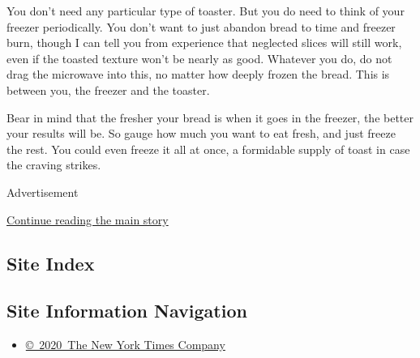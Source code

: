 You don't need any particular type of toaster. But you do need to think
of your freezer periodically. You don't want to just abandon bread to
time and freezer burn, though I can tell you from experience that
neglected slices will still work, even if the toasted texture won't be
nearly as good. Whatever you do, do not drag the microwave into this, no
matter how deeply frozen the bread. This is between you, the freezer and
the toaster.

Bear in mind that the fresher your bread is when it goes in the freezer,
the better your results will be. So gauge how much you want to eat
fresh, and just freeze the rest. You could even freeze it all at once, a
formidable supply of toast in case the craving strikes.

Advertisement

\protect\hyperlink{after-bottom}{Continue reading the main story}

\hypertarget{site-index}{%
\subsection{Site Index}\label{site-index}}

\hypertarget{site-information-navigation}{%
\subsection{Site Information
Navigation}\label{site-information-navigation}}

\begin{itemize}
\tightlist
\item
  \href{https://help.nytimes3xbfgragh.onion/hc/en-us/articles/115014792127-Copyright-notice}{©~2020~The
  New York Times Company}
\end{itemize}

